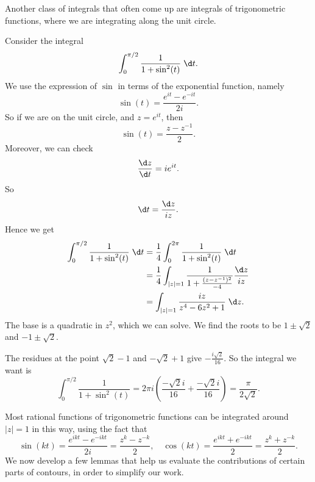 \documentclass[a4paper]{article}
\begin{document}
Another class of integrals that often come up are integrals of trigonometric functions, where we are integrating along the unit circle.
\begin{eg}
  Consider the integral
  \[
    \int_0^{\pi/2} \frac{1}{1 + \sin^2(t)}\;\d t.
  \]
  We use the expression of $\sin$ in terms of the exponential function, namely
  \[
    \sin(t) = \frac{e^{it} - e^{-it}}{2i}.
  \]
  So if we are on the unit circle, and $z = e^{it}$, then
  \[
    \sin (t) = \frac{z - z^{-1}}{2}.
  \]
  Moreover, we can check
  \[
    \frac{\d z}{\d t} = ie^{it}.
  \]
  So
  \[
    \d t = \frac{\d z}{iz}.
  \]
  Hence we get
  \begin{align*}
    \int_0^{\pi/2} \frac{1}{1 + \sin^2(t)} \;\d t &= \frac{1}{4} \int_0^{2\pi} \frac{1}{1 + \sin^2 (t)}\;\d t\\
    &= \frac{1}{4} \int_{|z| = 1} \frac{1}{1 + \frac{(z - z^{-1})^2}{-4}} \frac{\d z}{iz}\\
    &= \int_{|z| = 1}\frac{i z}{z^4 - 6z^2 + 1}\;\d z.
  \end{align*}
  The base is a quadratic in $z^2$, which we can solve. We find the roots to be $1 \pm \sqrt{2}$ and $-1 \pm \sqrt{2}$.
  \begin{center}
  \end{center}
  The residues at the point $\sqrt{2} - 1$ and $-\sqrt{2} + 1$ give $-\frac{i\sqrt{2}}{16}$. So the integral we want is
  \[
    \int_0^{\pi/2} \frac{1}{1 + \sin^2(t)} = 2\pi i\left(\frac{-\sqrt{2}i}{16} + \frac{-\sqrt{2} i}{16}\right) = \frac{\pi}{2\sqrt{2}}.
  \]
\end{eg}
Most rational functions of trigonometric functions can be integrated around $|z| = 1$ in this way, using the fact that
\[
  \sin (kt) = \frac{e^{ikt} - e^{-ikt}}{2i} = \frac{z^k - z^{-k}}{2},\quad \cos(kt) = \frac{e^{ikt} + e^{-ikt}}{2} = \frac{z^k + z^{-k}}{2}.
\]
We now develop a few lemmas that help us evaluate the contributions of certain parts of contours, in order to simplify our work.
\end{document}
